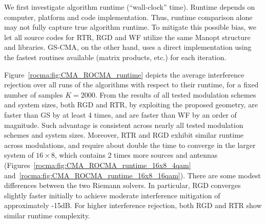 We first investigate
algorithm runtime (``wall-clock'' time). Runtime depends on computer, platform and code implementation. Thus, runtime comparison 
alone may not fully capture true
algorithm runtime. 
To mitigate this possible bias, 
we let
all source codes for RTR, RGD and WF utilize the same Manopt structure and libraries. GS-CMA, on the other hand, uses a direct implementation using the fastest routines available (matrix products, etc.)
for each iteration.

Figure~\ref{rocma:fig:CMA_ROCMA_runtime} depicts the average interference rejection over all runs of the algorithms with respect to their runtime, for a fixed number of samples $K=2000$. From the results of
all tested modulation schemes and system sizes, both RGD and RTR, by exploiting
the proposed geometry, 
are faster than GS by at least 4 times, and
are faster than WF by an order of magnitude.
Such advantage is consistent 
across nearly all tested modulation schemes and system sizes. 
Moreover, RTR and RGD exhibit similar runtime across modulations, and require about double the time to converge in the larger system
of $16\times 8$, which contains 2 times more sources and antennas (Figures~\ref{rocma:fig:CMA_ROCMA_runtime_16x8_4qam} and~\ref{rocma:fig:CMA_ROCMA_runtime_16x8_16qam}). 
There are some modest differences
between the two Riemann solvers. In 
particular, RGD converges slightly faster initially to achieve moderate interference mitigation of
approximately -15dB. For higher
interference rejection, both RGD and RTR 
show similar runtime complexity. 
